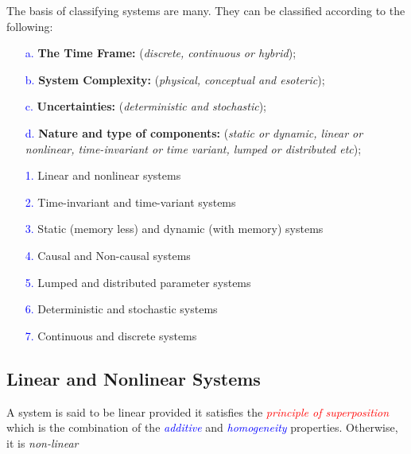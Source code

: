 \documentclass[
  12pt,
  a4paper,
]{report}
\begin{document}
The basis of classifying systems are many. They can be classified
according to the following:

\begin{tcolorbox}[colback=boxbodycol,colframe=boxheadcol,title=\textcolor{red}{\textbf{Types of System Classifications}}]
\label{fig:system-type-list-tc}
    \begin{itemize}
        \item[\textcolor{blue}{a.}] \textbf{The Time Frame:} (\emph{discrete, continuous or hybrid});
        \item[\textcolor{blue}{b.}] \textbf{System Complexity:} (\emph{physical, conceptual and esoteric});
        \item[\textcolor{blue}{c.}] \textbf{Uncertainties:} (\emph{deterministic and stochastic});
        \item[\textcolor{blue}{d.}] \textbf{Nature and type of components:} (\emph{static or dynamic, linear or nonlinear, time-invariant or time variant, lumped or distributed etc});
    \end{itemize}
    \begin{enumerate}
        \item[\textcolor{blue}{1.}] Linear and nonlinear systems
        \item[\textcolor{blue}{2.}] Time-invariant and time-variant systems
        \item[\textcolor{blue}{3.}] Static (memory less) and dynamic (with memory) systems
        \item[\textcolor{blue}{4.}] Causal and Non-causal systems
        \item[\textcolor{blue}{5.}] Lumped and distributed parameter systems
        \item[\textcolor{blue}{6.}] Deterministic and stochastic systems
        \item[\textcolor{blue}{7.}] Continuous and discrete systems
    \end{enumerate}
\end{tcolorbox}

\subsection{Linear and Nonlinear
Systems}\label{linear-and-nonlinear-systems}

\begin{tcolorbox}[colback=boxbodycol,colframe=boxheadcol,title=\textcolor{red}{\textbf{Linear and Nonlinear Systems}}]
    \label{fig:linear-nonlinear-system-def-md}
    A system is said to be linear provided it satisfies the \textcolor{red}{\emph{principle of superposition}} which is the combination of the \textcolor{blue}{\emph{additive}} and \textcolor{blue}{\emph{homogeneity}} properties. Otherwise, it is \emph{non-linear}
\end{tcolorbox}
\end{document}
